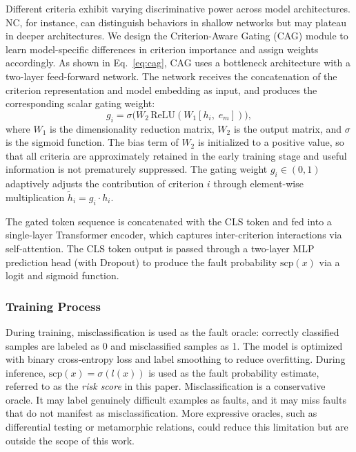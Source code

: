 \documentclass[preprint,number,5p,twocolumn]{elsarticle}
\begin{document}
Different criteria exhibit varying discriminative power across model architectures. NC, for instance, can distinguish behaviors in shallow networks but may plateau in deeper architectures. We design the Criterion-Aware Gating (CAG) module to learn model-specific differences in criterion importance and assign weights accordingly. As shown in Eq.~\ref{eq:cag}, CAG uses a bottleneck architecture with a two-layer feed-forward network. The network receives the concatenation of the criterion representation and model embedding as input, and produces the corresponding scalar gating weight:
\begin{equation}\label{eq:cag}
  g_i = \sigma\bigl(W_2 \, \mathrm{ReLU}(W_1 [h_i,\; e_m])\bigr),
\end{equation}
where $W_1$ is the dimensionality reduction matrix, $W_2$ is the output matrix, and $\sigma$ is the sigmoid function. The bias term of $W_2$ is initialized to a positive value, so that all criteria are approximately retained in the early training stage and useful information is not prematurely suppressed. The gating weight $g_i \in (0, 1)$ adaptively adjusts the contribution of criterion $i$ through element-wise multiplication $\tilde{h}_i = g_i \cdot h_i$.

The gated token sequence is concatenated with the CLS token and fed into a single-layer Transformer encoder, which captures inter-criterion interactions via self-attention. The CLS token output is passed through a two-layer MLP prediction head (with Dropout) to produce the fault probability $\mathrm{scp}(x)$ via a logit and sigmoid function.

\subsubsection{Training Process}

During training, misclassification is used as the fault oracle: correctly classified samples are labeled as 0 and misclassified samples as 1. The model is optimized with binary cross-entropy loss and label smoothing to reduce overfitting. During inference, $\mathrm{scp}(x) = \sigma(l(x))$ is used as the fault probability estimate, referred to as the \emph{risk score} in this paper. Misclassification is a conservative oracle. It may label genuinely difficult examples as faults, and it may miss faults that do not manifest as misclassification. More expressive oracles, such as differential testing or metamorphic relations, could reduce this limitation but are outside the scope of this work.
\end{document}
